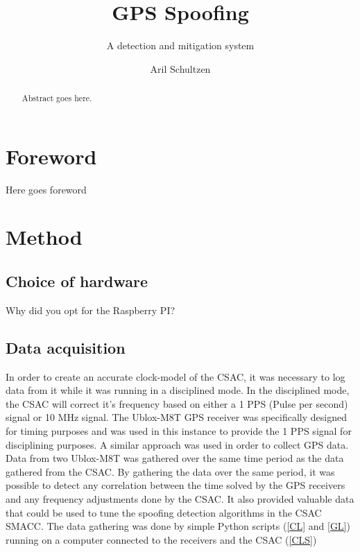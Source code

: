 \documentclass[12pt,english,a4paper]{report}
\title{GPS Spoofing}
\subtitle{A detection and mitigation system}
\author{Aril Schultzen}
\begin{document}
\duoforside[dept={Institutt for informatikk},
program={Informatikk: programmering og nettverk},
long]

\begin{abstract}
Abstract goes here.
\end{abstract}

\chapter*{Foreword}
Here goes foreword

\thispagestyle{empty}
\setcounter{page}{0}
\tableofcontents
\thispagestyle{empty}
\setcounter{page}{0}
\thispagestyle{empty}
\setcounter{page}{0}
\clearpage
\setcounter{page}{1}





\chapter{Method}
\section{Choice of hardware}
Why did you opt for the Raspberry PI?

\section{Data acquisition}
In order to create an accurate clock-model of the CSAC, it was necessary to log data from it while it was running in a disciplined mode. In the disciplined mode, the CSAC will correct it's frequency based on either a 1 PPS (Pulse per second) signal or 10 MHz signal. The Ublox-M8T GPS receiver was specifically designed for timing purposes and was used in this instance to provide the 1 PPS signal for disciplining purposes. A similar approach was used in order to collect GPS data. Data from two Ublox-M8T was gathered over the same time period as the data gathered from the CSAC. By gathering the data over the same period, it was possible to detect any correlation between the time solved by the GPS receivers and any frequency adjustments done by the CSAC. It also provided valuable data that could be used to tune the spoofing detection algorithms in the CSAC SMACC. The data gathering was done by simple Python scripts (\ref{CL} and \ref{GL}) running on a computer connected to the receivers and the CSAC (\ref{CLS})
\end{document}
